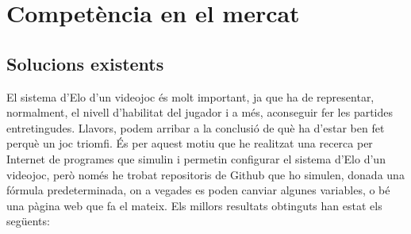 \documentclass[a4paper]{article}
\begin{document}
\newpage
\section{Competència en el mercat}
\subsection{Solucions existents}
El sistema d'Elo d'un videojoc és molt important, ja que ha de representar, normalment, el nivell d'habilitat del jugador i a més, aconseguir fer les partides entretingudes. Llavors, podem arribar a la conclusió de què ha d'estar ben fet perquè un joc triomfi. És per aquest motiu que he realitzat una recerca per Internet de programes que simulin i permetin configurar el sistema d'Elo d'un videojoc, però només he trobat repositoris de Github que ho simulen, donada una fórmula predeterminada, on a vegades es poden canviar algunes variables, o bé una pàgina web que fa el mateix. Els millors resultats obtinguts han estat els següents:
\end{document}

